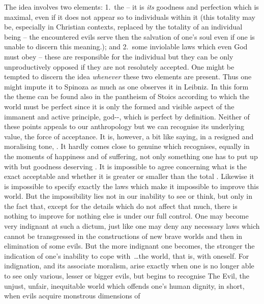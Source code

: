 {The idea involves two elements: 1.~the  -- it is {\em
  its} goodness and perfection which is maximal, even if it does not appear so
to individuals within it (this totality may be, especially in Christian
contexts, replaced by the totality of an individual being -- the encountered
evils serve then the salvation of one's soul even if one is unable to discern
this meaning.); and 2.~some inviolable laws which even God must obey -- these
are responsible for the individual  but they can be only
unproductively opposed if they are not resolutely accepted.  One might be
tempted to discern the idea {\em whenever} these two elements are present.
Thus one might impute it to Spinoza as much as one observes it in Leibniz. In
this form the theme can be found also in the pantheism of Stoics according to
which the world must be perfect since it is only the formed and visible aspect
of the immanent and active principle, god--, which is
perfect by definition. Neither of these points appeals
to our anthropology but we can recognise its underlying
value, the  force of acceptance. It is, however, a bit like
saying, in a resigned and moralising tone, .  It hardly comes close to genuine  which
recognises, equally in the moments of happiness and of suffering, not only
  something one has to put up with but goodness deserving .}
%  
It is impossible to agree concerning what is the exact acceptable  and whether it is greater or smaller than the total
. Likewise it is impossible to specify exactly the laws
which make it impossible to improve this world. But the impossibility lies not
in our inability to see or think, but only in the fact that, except for the
 details which do not affect that much, there is nothing to improve
for nothing else is under our full control. One may become very indignant at
such a dictum, just like one may deny any necessary laws which cannot be
transgressed in the constructions of new brave worlds and then in
elimination of some evils. But the more indignant one becomes, the stronger the
indication of one's inability to cope with~\ldots the world, that is, with
oneself. For indignation, and its associate moralism, arise exactly when one is
no longer able to see only various, lesser or bigger evils, but begins to
recognise The Evil, the unjust, unfair, inequitable world which offends one's
human dignity, in short, when  evils acquire monstrous dimensions of
